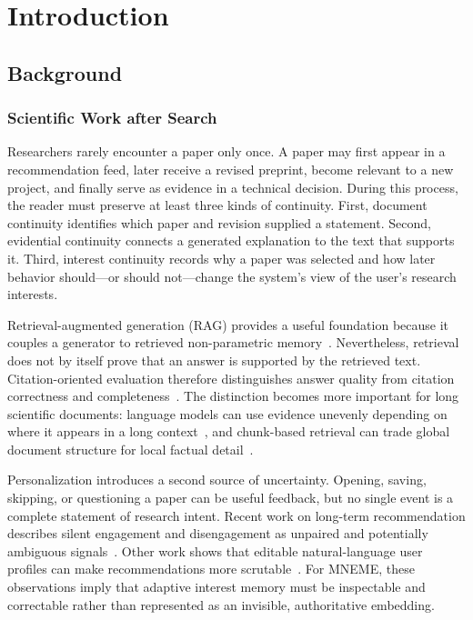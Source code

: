 ﻿%

\chapter{Introduction}

\section{Background}

\subsection{Scientific Work after Search}

Researchers rarely encounter a paper only once.
A paper may first appear in a recommendation feed, later receive a revised preprint, become relevant to a new project, and finally serve as evidence in a technical decision.
During this process, the reader must preserve at least three kinds of continuity.
First, document continuity identifies which paper and revision supplied a statement.
Second, evidential continuity connects a generated explanation to the text that supports it.
Third, interest continuity records why a paper was selected and how later behavior should---or should not---change the system's view of the user's research interests.

Retrieval-augmented generation (RAG) provides a useful foundation because it couples a generator to retrieved non-parametric memory~\cite{lewis2020rag}.
Nevertheless, retrieval does not by itself prove that an answer is supported by the retrieved text.
Citation-oriented evaluation therefore distinguishes answer quality from citation correctness and completeness~\cite{gao2023alce}.
The distinction becomes more important for long scientific documents: language models can use evidence unevenly depending on where it appears in a long context~\cite{liu2024lost}, and chunk-based retrieval can trade global document structure for local factual detail~\cite{zhao2024longrag}.

Personalization introduces a second source of uncertainty.
Opening, saving, skipping, or questioning a paper can be useful feedback, but no single event is a complete statement of research intent.
Recent work on long-term recommendation describes silent engagement and disengagement as unpaired and potentially ambiguous signals~\cite{zhang2025unpaired}.
Other work shows that editable natural-language user profiles can make recommendations more scrutable~\cite{ramos2024scrutable}.
For MNEME, these observations imply that adaptive interest memory must be inspectable and correctable rather than represented as an invisible, authoritative embedding.

